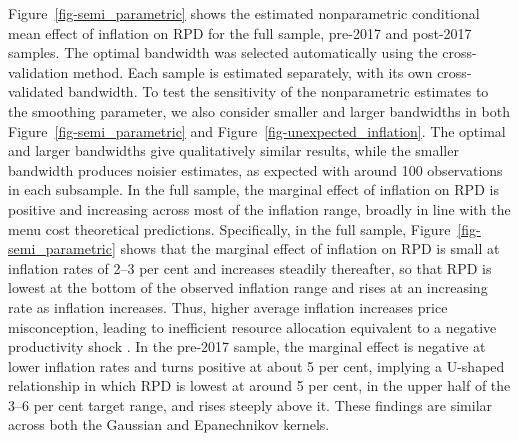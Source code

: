 \documentclass[
  letterpaper,
  DIV=11,
  numbers=noendperiod]{scrartcl}
\begin{document}
Figure~\ref{fig-semi_parametric} shows the estimated nonparametric
conditional mean effect of inflation on RPD for the full sample,
pre-2017 and post-2017 samples. The optimal bandwidth was selected
automatically using the cross-validation method. Each sample is
estimated separately, with its own cross-validated bandwidth. To test
the sensitivity of the nonparametric estimates to the smoothing
parameter, we also consider smaller and larger bandwidths in both
Figure~\ref{fig-semi_parametric} and
Figure~\ref{fig-unexpected_inflation}. The optimal and larger bandwidths
give qualitatively similar results, while the smaller bandwidth produces
noisier estimates, as expected with around 100 observations in each
subsample. In the full sample, the marginal effect of inflation on RPD
is positive and increasing across most of the inflation range, broadly
in line with the menu cost theoretical predictions. Specifically, in the
full sample, Figure~\ref{fig-semi_parametric} shows that the marginal
effect of inflation on RPD is small at inflation rates of 2--3 per cent
and increases steadily thereafter, so that RPD is lowest at the bottom
of the observed inflation range and rises at an increasing rate as
inflation increases. Thus, higher average inflation increases price
misconception, leading to inefficient resource allocation equivalent to
a negative productivity shock \citep{damjanovic2010}. In the pre-2017
sample, the marginal effect is negative at lower inflation rates and
turns positive at about 5 per cent, implying a U-shaped relationship in
which RPD is lowest at around 5 per cent, in the upper half of the 3--6
per cent target range, and rises steeply above it. These findings are
similar across both the Gaussian and Epanechnikov kernels.
\end{document}
